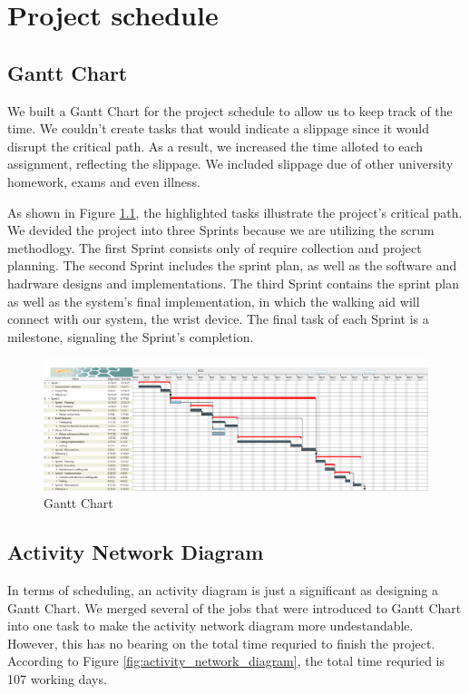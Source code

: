 \chapter{Project schedule}\label{ch:schedule}
    \section{Gantt Chart}
    We built a Gantt Chart for the project schedule to allow us to keep track of the time. We couldn't create tasks that
    would indicate a slippage since it would disrupt the critical path. As a result, we increased the time alloted to
    each assignment, reflecting the slippage. We included slippage due of other university homework, exams and even
    illness.

    As shown in Figure \ref{fig:gantt_chart}, the highlighted tasks illustrate the project's critical path. We devided
    the project into three Sprints because we are utilizing the scrum methodlogy. The first Sprint consists only of
    require collection and project planning. The second Sprint includes the sprint plan, as well as the software and
    hadrware designs and implementations. The third Sprint contains the sprint plan as well as the system's final
    implementation, in which the walking aid will connect with our system, the wrist device. The final task of each
    Sprint is a milestone, signaling the Sprint's completion.

    \begin{figure}[H]
      \includegraphics[width=\linewidth]{graphics/Gantt_Chart.png}
      \caption{Gantt Chart}
      \label{fig:gantt_chart}
    \end{figure}

    \section{Activity Network Diagram}

    In terms of scheduling, an activity diagram is just a significant as designing a Gantt Chart. We merged several of
    the jobs that were introduced to Gantt Chart into one task to make the activity network diagram more undestandable.
    However, this has no bearing on the total time requried to finish the project. According to Figure
    \ref{fig:activity_network_diagram}, the total time requried is 107 working days.

